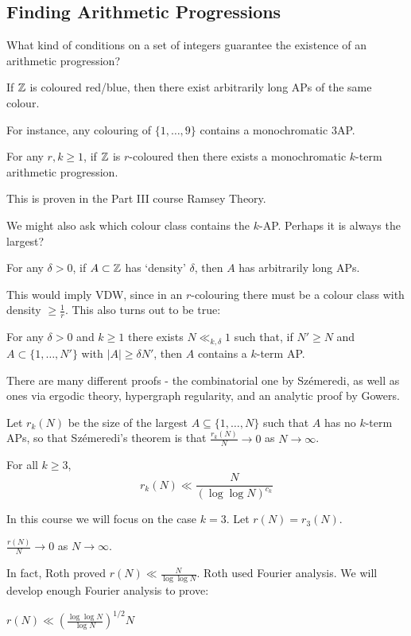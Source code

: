 \documentclass[10pt,a4paper]{article}
\begin{document}
\subsection{Finding Arithmetic Progressions}
What kind of conditions on a set of integers guarantee the existence of an arithmetic progression?
\begin{conjecture}[Baudet, 1920s]
  If $\mathbb{Z}$ is coloured red/blue, then there exist arbitrarily long APs of the same colour.
\end{conjecture}
For instance, any colouring of $\{1, \ldots, 9\}$ contains a monochromatic 3AP.
\begin{theorem}
  For any $r, k \geq 1$, if $\mathbb{Z}$ is $r$-coloured then there exists a monochromatic $k$-term arithmetic progression.
\end{theorem}
This is proven in the Part III course Ramsey Theory.

We might also ask which colour class contains the $k$-AP. Perhaps it is always the largest?
\begin{conjecture}
  For any $\delta > 0$, if $A \subset \mathbb{Z}$ has `density' $\delta$, then $A$ has arbitrarily long APs.
\end{conjecture}
This would imply VDW, since in an $r$-colouring there must be a colour class with density $\geq \frac{1}{r}$. This also turns out to be true:
\begin{theorem}
  For any $\delta > 0$ and $k \geq 1$ there exists $N \ll_{k, \delta} 1$ such that, if $N' \geq N$ and $A \subset \{1, \ldots, N'\}$ with $|A| \geq \delta N'$, then $A$ contains a $k$-term AP.
\end{theorem}
There are many different proofs - the combinatorial one by Sz\'emeredi, as well as ones via ergodic theory, hypergraph regularity, and an analytic proof by Gowers.

Let $r_k(N)$ be the size of the largest $A \subseteq \{1, \ldots, N\}$ such that $A$ has no $k$-term APs, so that Sz\'emeredi's theorem is that $\frac{r_k(N)}{N}\to 0$ as $N \to \infty$.
\begin{theorem}[Gowers]
  For all $k\geq 3$,
  \[r_k(N) \ll \frac{N}{(\log\log N)^{c_k}}\]
\end{theorem}
In this course we will focus on the case $k=3$. Let $r(N) = r_3(N)$.
\begin{theorem}[Roth, 1953]
  $\frac{r(N)}{N} \to 0$ as $N \to \infty$.
\end{theorem}
In fact, Roth proved $r(N) \ll \frac{N}{\log\log N}$. Roth used Fourier analysis. We will develop enough Fourier analysis to prove:
\begin{theorem}[Bourgain, 1999]
  $r(N) \ll \left(\frac{\log\log N}{\log N}\right)^{1/2}N$
\end{theorem}
\end{document}
